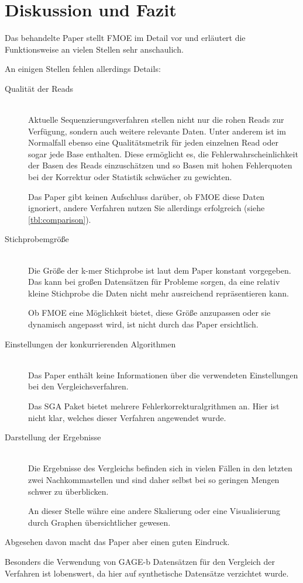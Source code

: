 \chapter{Diskussion und Fazit}
\label{ch:diskussion}

Das behandelte Paper stellt FMOE im Detail vor und erläutert die Funktionsweise an vielen Stellen sehr anschaulich.

An einigen Stellen fehlen allerdings Details:
\begin{description}
	\item[Qualität der Reads]\hfill\\
		Aktuelle Sequenzierungsverfahren stellen nicht nur die rohen Reads zur Verfügung, sondern auch weitere relevante Daten.
		Unter anderem ist im Normalfall ebenso eine Qualitätsmetrik für jeden einzelnen Read oder sogar jede Base enthalten.
		Diese ermöglicht es, die Fehlerwahrscheinlichkeit der Basen des Reads einzuschätzen und so Basen mit hohen Fehlerquoten bei der Korrektur oder Statistik schwächer zu gewichten.

		Das Paper gibt keinen Aufschluss darüber, ob FMOE diese Daten ignoriert, andere Verfahren nutzen Sie allerdings erfolgreich \cite{ReadQuality} \cite{BfcPaper} (siehe \ref{tbl:comparison}).

	\item[Stichprobemgröße]\hfill\\
		Die Größe der k-mer Stichprobe ist laut dem Paper konstant vorgegeben.
		Das kann bei großen Datensätzen für Probleme sorgen, da eine relativ kleine Stichprobe die Daten nicht mehr ausreichend repräsentieren kann.

		Ob FMOE eine Möglichkeit bietet, diese Größe anzupassen oder sie dynamisch angepasst wird, ist nicht durch das Paper ersichtlich.
	
	\item[Einstellungen der konkurrierenden Algorithmen]\hfill\\
		Das Paper enthält keine Informationen über die verwendeten Einstellungen bei den Vergleichsverfahren.

		Das SGA Paket bietet mehrere Fehlerkorrekturalgrithmen an.
		Hier ist nicht klar, welches dieser Verfahren angewendet wurde.

	\item[Darstellung der Ergebnisse]\hfill\\
		Die Ergebnisse des Vergleichs befinden sich in vielen Fällen in den letzten zwei Nachkommastellen und sind daher selbst bei so geringen Mengen schwer zu überblicken.

		An dieser Stelle währe eine andere Skalierung oder eine Visualisierung durch Graphen übersichtlicher gewesen.
\end{description}

Abgesehen davon macht das Paper aber einen guten Eindruck.

Besonders die Verwendung von GAGE-b Datensätzen für den Vergleich der Verfahren ist lobenswert, da hier auf synthetische Datensätze verzichtet wurde.
